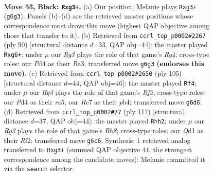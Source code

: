 \documentclass[11pt]{article}
\begin{document}
\clearpage

\begin{figure}[p]\centering
\begin{subfigure}{0.46\textwidth}\centering
\resizebox{\linewidth}{!}{%
\newchessgame
\chessboard[
  setfen={8/2r3pk/1P4r1/8/3pp3/6R1/5PK1/3q4 b - - 0 53},
  showmover=false,
  pgfstyle=straightmove, color=movearrow, markmove={g6-g3}
]}
\caption{}
\end{subfigure}\hfill
\begin{subfigure}{0.46\textwidth}\centering
\resizebox{\linewidth}{!}{%
\newchessgame
\chessboard[
  setfen={8/5pk1/6r1/1p6/6R1/4R2P/2r3PK/8 w - - 10 46},
  showmover=false,
  pgfstyle=straightmove, color=movearrow, markmove={g4-g6}
]}
\caption{}
\end{subfigure}
\\[4pt]
\begin{subfigure}{0.46\textwidth}\centering
\resizebox{\linewidth}{!}{%
\newchessgame
\chessboard[
  setfen={8/1KR2rpk/7p/R6P/1P6/P3r3/8/8 b - - 23 53},
  showmover=false,
  pgfstyle=straightmove, color=movearrow, markmove={f7-f4}
]}
\caption{}
\end{subfigure}\hfill
\begin{subfigure}{0.46\textwidth}\centering
\resizebox{\linewidth}{!}{%
\newchessgame
\chessboard[
  setfen={8/5pk1/P7/5pP1/8/R7/1P3r2/3KR2r b - - 6 59},
  showmover=false,
  pgfstyle=straightmove, color=movearrow, markmove={h1-h2}
]}
\caption{}
\end{subfigure}
\caption{\textbf{Move 53, Black: \texttt{Rxg3+}.} (a) Our position; Melanie plays \texttt{Rxg3+} (\texttt{g6g3}). Panels (b)--(d) are the retrieved master positions whose correspondence most drove this move (highest QAP objective among those that transfer to it). (b) Retrieved from \texttt{ccrl\_top\_p0002\#2267} (ply 90) [structural distance $d$=33, QAP obj=44]: the master played \texttt{Rxg6+}; under $\mu$ our \emph{Rg3} plays the role of that game's \emph{Rg4}; cross-type roles: our \emph{P}d4 as their \emph{R}e3; transferred move \texttt{g6g3} \textbf{(endorses this move)}. (c) Retrieved from \texttt{ccrl\_top\_p0002\#2650} (ply 105) [structural distance $d$=44, QAP obj=46]: the master played \texttt{Rf4}; under $\mu$ our \emph{Rg3} plays the role of that game's \emph{Rf2}; cross-type roles: our \emph{P}d4 as their \emph{r}a5, our \emph{R}c7 as their \emph{p}b4; transferred move \texttt{g6d6}. (d) Retrieved from \texttt{ccrl\_top\_p0002\#77} (ply 117) [structural distance $d$=37, QAP obj=44]: the master played \texttt{Rhh2}; under $\mu$ our \emph{Rg3} plays the role of that game's \emph{Rh8}; cross-type roles: our \emph{Q}d1 as their \emph{R}f2; transferred move \texttt{g6c6}. Synthesis: 1 retrieved analog transferred to \texttt{Rxg3+} (summed QAP objective 44, the strongest correspondence among the candidate moves); Melanie committed it via the \texttt{search} selector.}
\label{fig:thought-m105}
\end{figure}
\end{document}
